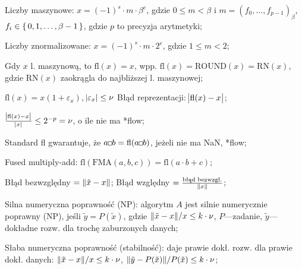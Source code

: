 
\entry
Liczby maszynowe: $x=(-1)^s \cdot m \cdot \beta^e$, gdzie $0\leq m < \beta$ i $m=(f_0, \ldots, f_{p-1})_\beta$, $f_i\in\set{0,1,\ldots,\beta-1}$, gdzie $p$ to precyzja arytmetyki;

\entry
Liczby znormalizowane: $x=(-1)^s\cdot m \cdot 2^e$, gdzie $1\leq m < 2$;

\entry
Gdy $x$ l. maszynową, to $\mathrm{fl}(x)=x$, wpp. $\mathrm{fl}(x)=\mathrm{ROUND}(x)=\mathrm{RN}(x)$, gdzie $\mathrm{RN}(x)$ zaokrągla do najbliższej l. maszynowej;

\entry
$\mathrm{fl}(x) = x(1+\varepsilon_x)$, $\abs{\varepsilon_x}\leq \nu$
\entry
Błąd reprezentacji: $\abs{\mathrm{fl}(x) - x}$;

\entry
$\frac{\abs{\mathrm{fl}(x) - x}}{\abs{x}}\leq 2^{-p}=\nu$, o ile nie ma *flow;

\entry
Standard fl gwarantuje, że $a \Hsquare b = \mathrm{fl}(a\Hsquare b)$, jeżeli nie ma NaN, *flow;

\entry
Fused multiply-add:
$\mathrm{fl}(\mathrm{FMA}(a,b,c)) = \mathrm{fl}(a \cdot b + c)$;


\entry
Błąd bezwzględny $=\|\tilde{x} - x\|$;
\entry
Błąd względny $=\frac{\text{błąd bezwzgl.}}{\|x\|}$;

\entry
Silna numeryczna poprawność (NP): algorytm $A$ jest silnie numerycznie poprawny (NP), jeśli $\tilde{y} = P(\tilde{x})$, gdzie $\|\tilde{x}-x\| / x\leq k\cdot\nu$, $P$---zadanie, $\tilde{y}$---dokładne rozw. dla trochę zaburzonych danych;

\entry
Słaba numeryczna poprawność (stabilność): daje prawie dokł. rozw. dla prawie dokł. danych: $\|\tilde{x}-x\| / x\leq k\cdot\nu$, $\|\tilde{y}-P(\tilde{x})\| / P(\tilde{x})\leq k\cdot\nu$;
